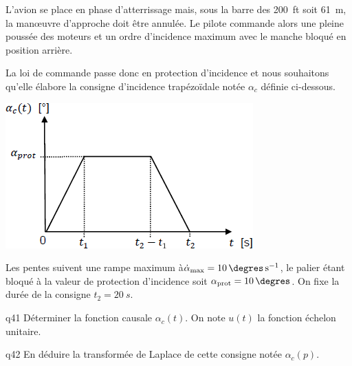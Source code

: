 \begin{multicols}{2}
L’avion se place en phase d’atterrissage mais, sous la barre des \SI{200}{ft} soit \SI{61}{m}, la man\oe{}uvre d’approche
doit être annulée. Le pilote commande alors une pleine poussée des moteurs et un ordre d’incidence
maximum avec le manche bloqué en position arrière.

La loi de commande passe donc en protection
d’incidence et nous souhaitons qu’elle élabore la
consigne d’incidence trapézoïdale notée $\alpha_c$
définie ci-dessous.
\begin{center}
\includegraphics[width=\linewidth]{images/fig_20}
\end{center}

Les pentes suivent une rampe maximum à$ \dot{\alpha}_{\text{max}}=\SI{10}{\degres.s^{-1}}$, le palier étant bloqué à la valeur de protection d’incidence soit $\alpha_{\text{prot}}=\SI{10}{\degres}$. On fixe la durée de la consigne $t_2=\SI{20}{s}$.

{\begin{question}{q41}
Déterminer la fonction causale $\alpha_c(t)$. On note $u(t)$ la fonction échelon unitaire.
\ifprof
\begin{corrige}
\end{corrige}
\else
\fi
\begin{reponses}
\end{reponses} \end{question}}  


{\begin{question}{q42}
En déduire la transformée de Laplace de cette consigne notée  $\alpha_c(p)$.
\ifprof
\begin{corrige}
\end{corrige}
\else
\fi
\begin{reponses}
\end{reponses} \end{question}}  


\end{multicols}
